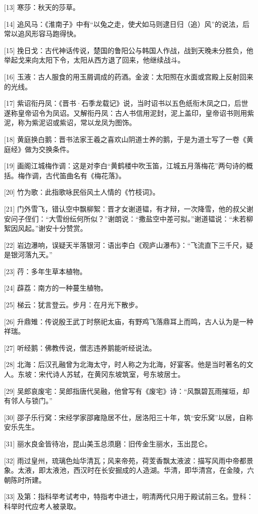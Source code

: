 \documentclass[12pt,UTF8]{ctexbook}
\begin{document}
[13] 寒莎：秋天的莎草。

[14] 追风马：《淮南子》中有“以兔之走，使犬如马则逮日归（追）风”的说法，后常以追风形容马跑得快。

[15] 挽日戈：古代神话传说，楚国的鲁阳公与韩国人作战，战到天晚未分胜负，他举起戈来向太阳下令，太阳从西方退了回来，他继续战斗。

[16] 玉液：古人服食的用玉屑调成的药酒。金波：太阳照在水面或宫殿上反射回来的光线。

[17] 紫诏衔丹凤：《晋书·石季龙载记》说，当时诏书以五色纸衔木凤之口，后世遂称皇帝诏令为凤诏。又解衔丹凤：古人书信用泥封，泥上盖印，皇帝诏书则用紫泥，称为紫泥诏或紫诏，常以龙凤为图饰。

[18] 黄庭换白鹅：晋书法家王羲之喜欢山阴道士养的鹅，于是为道士写了一卷《黄庭经》做为交换条件。

[19] 画阁江城梅作调：这是对李白“黄鹤楼中吹玉笛，江城五月落梅花”两句诗的概括。梅作调，古代笛曲名有《梅花落》。

[20] 竹为歌：此指歌咏民俗风土人情的《竹枝词》。

[21] 门外雪飞，错认空中飘柳絮：晋才女谢道韫，有才辩，一次降雪，他的叔父谢安问子侄们：“大雪纷纭何所似？”谢朗说：“撒盐空中差可拟。”谢道韫说：“未若柳絮因风起。”谢安十分赞赏。

[22] 岩边瀑响，误疑天半落银河：语出李白《观庐山瀑布》：“飞流直下三千尺，疑是银河落九天。”

[23] 荇：多年生草本植物。

[24] 薜荔：南方的一种蔓生植物。

[25] 梯云：犹言登云。步月：在月光下散步。

[26] 升鼎雉：传说殷王武丁时祭祀太庙，有野鸡飞落鼎耳上而鸣，古人认为是一种祥瑞。

[27] 听经鹅：佛教传说，僧志违养鹅能听经说法。

[28] 北海：后汉孔融曾为北海太守，时人称之为北海，好宴客。他是当时著名的文人。东坡：宋代诗人苏轼，在黄冈东坡筑室，号东坡居士。

[29] 吴郎哀废宅：吴郎指唐代吴融，他曾写有《废宅》诗：“风飘碧瓦雨摧垣，却有邻人与锁门。”

[30] 邵子乐行窝：宋经学家邵雍隐居不仕，居洛阳三十年，筑“安乐窝”以居，自称安乐先生。

[31] 丽水良金皆待冶，昆山美玉总须磨：旧传金生丽水，玉出昆仑。

[32] 雨过皇州，琉璃色灿华清瓦；风来帝苑，荷芰香飘太液波：描写风雨中帝都景象。太液，即太液池，西汉时在长安掘成的人造湖。华清，即华清宫，在金陵，六朝陈时所建。

[33] 及第：指科举考试考中，特指考中进士，明清两代只用于殿试前三名。登科：科举时代应考人被录取。
\end{document}
